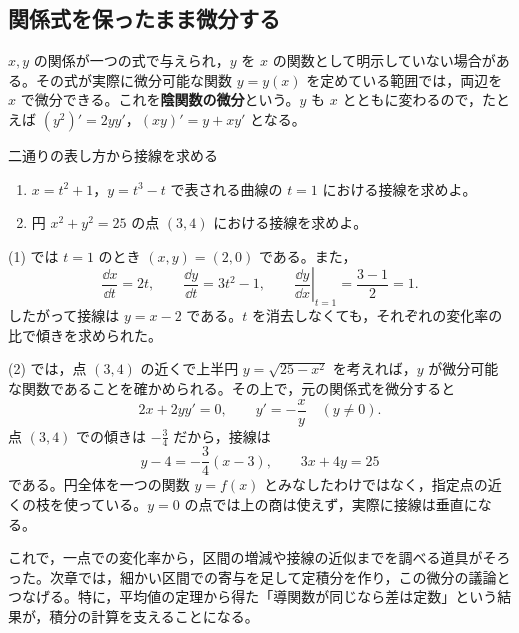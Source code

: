 \subsection{関係式を保ったまま微分する}
$x,y$ の関係が一つの式で与えられ，$y$ を $x$ の関数として明示していない場合がある。その式が実際に微分可能な関数 $y=y(x)$ を定めている範囲では，両辺を $x$ で微分できる。これを\textbf{陰関数の微分}という。$y$ も $x$ とともに変わるので，たとえば $(y^2)'=2yy'$，$(xy)'=y+xy'$ となる。

\begin{example}{二通りの表し方から接線を求める}
\begin{enumerate}[label=(\arabic*),leftmargin=*]
 \item $x=t^2+1$，$y=t^3-t$ で表される曲線の $t=1$ における接線を求めよ。
 \item 円 $x^2+y^2=25$ の点 $(3,4)$ における接線を求めよ。
\end{enumerate}
\end{example}
(1) では $t=1$ のとき $(x,y)=(2,0)$ である。また，
\[
 \frac{\dd x}{\dd t}=2t,\qquad
 \frac{\dd y}{\dd t}=3t^2-1,\qquad
 \left.\frac{\dd y}{\dd x}\right|_{t=1}
 =\frac{3-1}{2}=1.
\]
したがって接線は $y=x-2$ である。$t$ を消去しなくても，それぞれの変化率の比で傾きを求められた。

(2) では，点 $(3,4)$ の近くで上半円 $y=\sqrt{25-x^2}$ を考えれば，$y$ が微分可能な関数であることを確かめられる。その上で，元の関係式を微分すると
\[
 2x+2yy'=0,\qquad y'=-\frac xy\quad(y\ne0).
\]
点 $(3,4)$ での傾きは $-\frac34$ だから，接線は
\[
 y-4=-\frac34(x-3),\qquad 3x+4y=25
\]
である。円全体を一つの関数 $y=f(x)$ とみなしたわけではなく，指定点の近くの枝を使っている。$y=0$ の点では上の商は使えず，実際に接線は垂直になる。

これで，一点での変化率から，区間の増減や接線の近似までを調べる道具がそろった。次章では，細かい区間での寄与を足して定積分を作り，この微分の議論とつなげる。特に，平均値の定理から得た「導関数が同じなら差は定数」という結果が，積分の計算を支えることになる。

